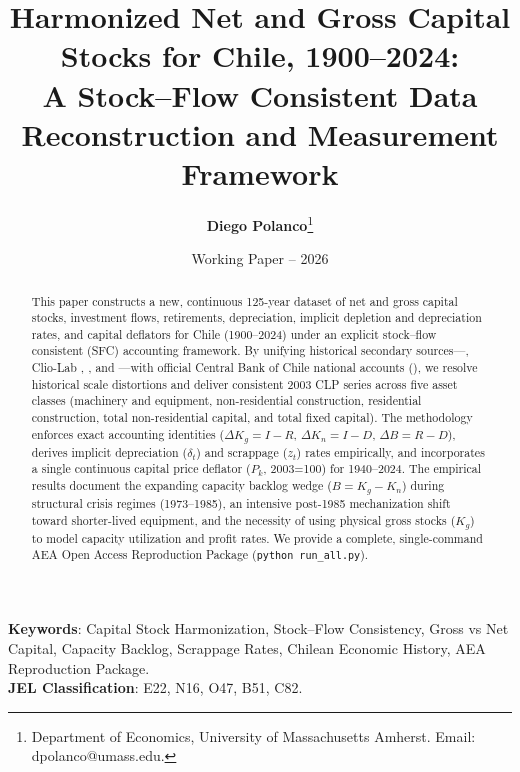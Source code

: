 \documentclass[11pt,a4paper]{article}
\title{\textbf{Harmonized Net and Gross Capital Stocks for Chile, 1900--2024:} \\
\Large A Stock--Flow Consistent Data Reconstruction and Measurement Framework}
\author{\textbf{Diego Polanco}\thanks{Department of Economics, University of Massachusetts Amherst. Email: dpolanco@umass.edu.}}
\date{Working Paper -- 2026}
\begin{document}
\maketitle

\begin{abstract}
This paper constructs a new, continuous 125-year dataset of net and gross capital stocks, investment flows, retirements, depreciation, implicit depletion and depreciation rates, and capital deflators for Chile (1900--2024) under an explicit stock--flow consistent (SFC) accounting framework. By unifying historical secondary sources—\citet{Hofman2000a}, Clio-Lab \citep{DiazWagner2016}, \citet{TafunellDucoing2016}, and \citet{PerezEyzaguirre2019}—with official Central Bank of Chile national accounts (\citealt{BCCH2024}), we resolve historical scale distortions and deliver consistent 2003 CLP series across five asset classes (machinery and equipment, non-residential construction, residential construction, total non-residential capital, and total fixed capital). The methodology enforces exact accounting identities ($\Delta K_g = I - R$, $\Delta K_n = I - D$, $\Delta B = R - D$), derives implicit depreciation ($\delta_t$) and scrappage ($z_t$) rates empirically, and incorporates a single continuous capital price deflator ($P_k$, 2003=100) for 1940--2024. The empirical results document the expanding capacity backlog wedge ($B = K_g - K_n$) during structural crisis regimes (1973--1985), an intensive post-1985 mechanization shift toward shorter-lived equipment, and the necessity of using physical gross stocks ($K_g$) to model capacity utilization and profit rates. We provide a complete, single-command AEA Open Access Reproduction Package (\texttt{python run\_all.py}).
\end{abstract}

\vfill
\noindent \textbf{Keywords}: Capital Stock Harmonization, Stock--Flow Consistency, Gross vs Net Capital, Capacity Backlog, Scrappage Rates, Chilean Economic History, AEA Reproduction Package. \\
\noindent \textbf{JEL Classification}: E22, N16, O47, B51, C82.

\pagebreak
\tableofcontents
\pagebreak









\pagebreak



\pagebreak

\end{document}
